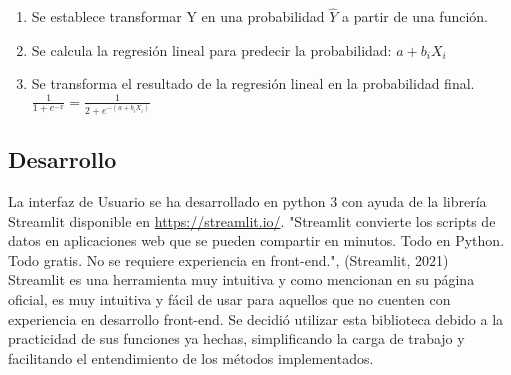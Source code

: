 \documentclass[10pt,a4paper]{article}
\begin{document}
\begin{enumerate}
    \item Se establece transformar Y en una probabilidad $\widehat{Y}$  a partir de una función.
    \item Se calcula la regresión lineal para predecir la probabilidad: $a+b_{i}X_{i}$
    \item Se transforma el resultado de la regresión lineal en la probabilidad final. $\frac{1}{1+e^{-x}}=\frac{1}{2+e^{-(a+b_{i}X_{i})}}$
\end{enumerate}

\subsection*{Desarrollo}
La interfaz de Usuario se ha desarrollado en python 3 con ayuda de la librería Streamlit disponible en \url{https://streamlit.io/}. "Streamlit convierte los scripts de datos en aplicaciones web que se pueden compartir en minutos. Todo en Python. Todo gratis. No se requiere experiencia en front-end.", (Streamlit, 2021)\\ 

Streamlit es una herramienta muy intuitiva y como mencionan en su página oficial, es muy intuitiva y fácil de usar para aquellos que no cuenten con experiencia en desarrollo front-end. Se decidió utilizar esta biblioteca debido a la practicidad de sus funciones ya hechas, simplificando la carga de trabajo y facilitando el entendimiento de los métodos implementados. \\
\end{document}
